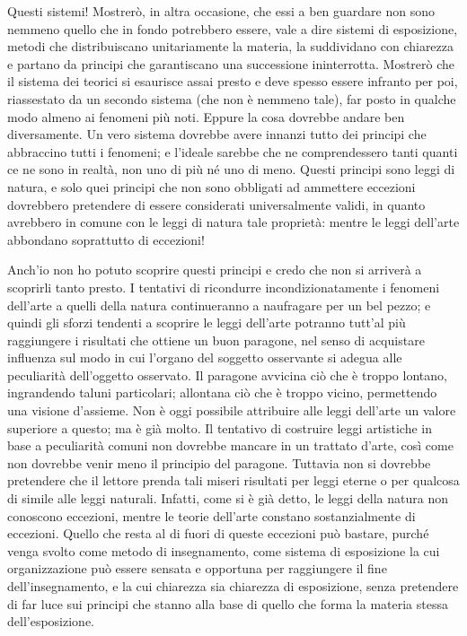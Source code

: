 Questi sistemi! Mostrerò, in altra occasione, che essi a ben guardare non sono nemmeno quello che in fondo potrebbero essere, vale a dire sistemi di esposizione, metodi che distribuiscano unitariamente la materia, la suddividano con chiarezza e partano da principi che garantiscano una successione ininterrotta. Mostrerò che il sistema dei teorici si esaurisce assai presto e deve spesso essere infranto per poi, riassestato da un secondo sistema (che non è nemmeno tale), far posto in qualche modo almeno ai fenomeni più noti. Eppure la cosa dovrebbe andare ben diversamente. Un vero sistema dovrebbe avere innanzi tutto dei principi che abbraccino tutti i fenomeni; e l'ideale sarebbe che ne comprendessero tanti quanti ce ne sono in realtà, non uno di più né uno di meno. Questi principi sono leggi di natura, e solo quei principi che non sono obbligati ad ammettere eccezioni dovrebbero pretendere di essere considerati universalmente validi, in quanto avrebbero in comune con le leggi di natura tale proprietà: mentre le leggi dell'arte abbondano soprattutto di eccezioni!

Anch'io non ho potuto scoprire questi principi e credo che non si arriverà a scoprirli tanto presto. I tentativi di ricondurre incondizionatamente i fenomeni dell'arte a quelli della natura continueranno a naufragare per un bel pezzo; e quindi gli sforzi tendenti a scoprire le leggi dell'arte potranno tutt'al più raggiungere i risultati che ottiene un buon paragone, nel senso di acquistare influenza sul modo in cui l'organo del soggetto osservante si adegua alle peculiarità dell'oggetto osservato. Il paragone avvicina ciò che è troppo lontano, ingrandendo taluni particolari; allontana ciò che è troppo vicino, permettendo una visione d'assieme. Non è oggi possibile attribuire alle leggi dell'arte un valore superiore a questo; ma è già molto. Il tentativo di costruire leggi artistiche in base a peculiarità comuni non dovrebbe mancare in un trattato d'arte, così come non dovrebbe venir meno il principio del paragone. Tuttavia non si dovrebbe pretendere che il lettore prenda tali miseri risultati per leggi eterne o per qualcosa di simile alle leggi naturali. Infatti, come si è già detto, le leggi della natura non conoscono eccezioni, mentre le teorie dell'arte constano sostanzialmente di eccezioni. Quello che resta al di fuori di queste eccezioni può bastare, purché venga svolto come metodo di insegnamento, come sistema di esposizione la cui organizzazione può essere sensata e opportuna per raggiungere il fine dell'insegnamento, e la cui chiarezza sia chiarezza di esposizione, senza pretendere di far luce sui principi che stanno alla base di quello che forma la materia stessa dell'esposizione.

